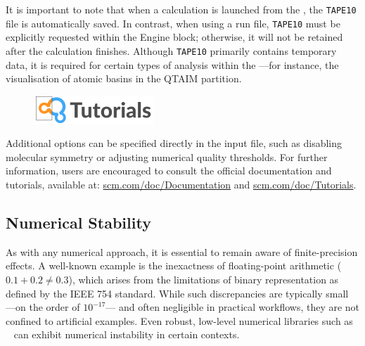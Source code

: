 It is important to note that when a calculation is launched from the \gui, the
\texttt{TAPE10} file is automatically saved. In contrast, when using a run file,
\texttt{TAPE10} must be explicitly requested within the Engine block;
otherwise, it will not be retained after the calculation finishes. Although
\texttt{TAPE10} primarily contains temporary data, it is required for certain
types of analysis within the \gui ---for instance, the visualisation of atomic
basins in the QTAIM partition.

\begin{figure}
  \centering
  \vspace{1.4cm}%
  \includegraphics[width=0.4\textwidth]{img/tutorial_logo.png}
\end{figure}

Additional options can be specified directly in the input file, such as
disabling molecular symmetry or adjusting numerical quality thresholds. For
further information, users are encouraged to consult the official \ams
documentation and tutorials, available at:
\href{http://www.scm.com/doc/Documentation/}{scm.com/doc/Documentation} and
\href{http://www.scm.com/doc/Tutorials/}{scm.com/doc/Tutorials}.

\newpage
\subsection{Numerical Stability}

As with any numerical approach, it is essential to remain aware of
finite-precision effects. A well-known example is the inexactness of
floating-point arithmetic (\eg $0.1 + 0.2 \neq 0.3$), which arises from the
limitations of binary representation as defined by the IEEE 754 standard. While
such discrepancies are typically small ---on the order of $10^{-17}$--- and
often negligible in practical workflows, they are not confined to artificial
examples.  Even robust, low-level numerical libraries such as
\lapack~\cite{laug} can exhibit numerical instability in certain contexts.

